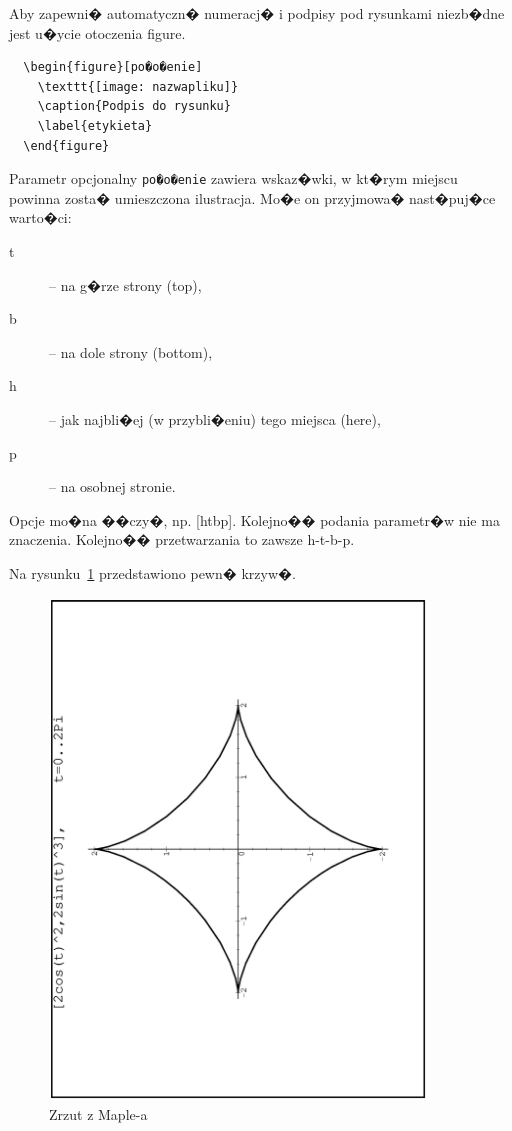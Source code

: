\documentclass[11pt,wide]{mwart}
\begin{document}
Aby zapewni� automatyczn� numeracj� i podpisy pod rysunkami niezb�dne jest u�ycie otoczenia
\textsf{figure}.
\begin{verbatim}
  \begin{figure}[po�o�enie]
    \texttt{[image: nazwapliku]}
    \caption{Podpis do rysunku}
    \label{etykieta}
  \end{figure}
\end{verbatim}
Parametr opcjonalny \texttt{po�o�enie} zawiera wskaz�wki, w kt�rym miejscu powinna
zosta� umieszczona ilustracja. Mo�e on przyjmowa� nast�puj�ce warto�ci:
\begin{description}
\item[t] -- na g�rze strony (top),
\item[b] -- na dole strony (bottom),
\item[h] -- jak najbli�ej (w przybli�eniu) tego miejsca (here),
\item[p] -- na osobnej stronie.
\end{description}

Opcje mo�na ��czy�, np. [htbp]. Kolejno�� podania parametr�w nie ma znaczenia. Kolejno�� przetwarzania to zawsze h-t-b-p.

\noindent Na rysunku~\ref{fig:rysunek} przedstawiono pewn� krzyw�.
\begin{figure}[ht]
  \begin{center}
  \includegraphics[width=10cm,angle=-90]{rysunek}
  \end{center}
  \caption{Zrzut z \textsf{Maple-a}}
  \label{fig:rysunek}
\end{figure}
\end{document}
